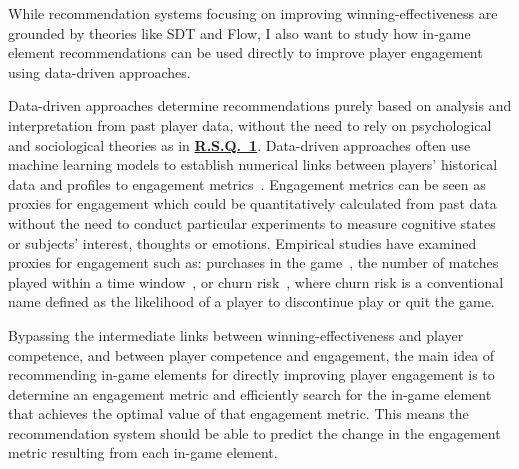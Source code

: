  





While recommendation systems  focusing on improving  winning-effectiveness are grounded by theories like SDT and Flow, I also want to study how in-game element recommendations can be used directly to improve player engagement using data-driven approaches.

Data-driven approaches determine recommendations purely based on analysis and interpretation from past player data, without the need to rely on psychological and sociological theories as in \hyperref[rq1]{\textbf{R.S.Q.~1}}. Data-driven approaches often use machine learning models to establish numerical links between players' historical data and profiles to engagement metrics~\citep{yannakakis2013player}. Engagement metrics can be seen as proxies for engagement which could be quantitatively calculated from past data without the need to conduct particular experiments to measure cognitive states or subjects' interest, thoughts or emotions. Empirical studies have examined proxies for engagement such as: purchases in the game~\citep{xie2015predicting,sifa2015predicting}, the number of matches played within a time window~\citep{xue2017dynamic,weber2011modeling,}, or churn risk~\citep{hadiji2014predicting,harrison2012players}, where churn risk is a conventional name defined as the likelihood of a player to discontinue play or quit the game. 

Bypassing the intermediate links between winning-effectiveness and player competence, and between player competence and engagement, the main idea of recommending in-game elements for directly improving player engagement is to determine an engagement metric and efficiently search for the in-game element that achieves the optimal value of that engagement metric. This means the recommendation system should be able to predict the change in the engagement metric resulting from each in-game element.  

